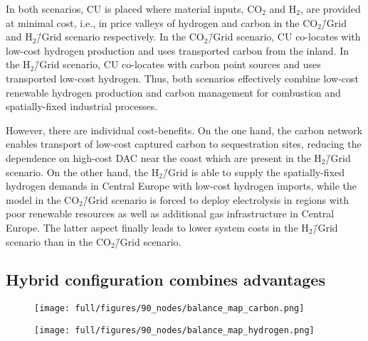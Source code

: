 \documentclass[twocolumn]{article}
\newcommand{\carbon}{CO$_2$}
\newcommand{\hydrogen}{H$_2$}
\newcommand{\carbongrid}{CO$_2$\=/Grid}
\newcommand{\hydrogengrid}{H$_2$\=/Grid}
\newcommand{\carbonscenario}{CO$_2$\=/Grid scenario}
\newcommand{\hydrogenscenario}{H$_2$\=/Grid scenario}
\newcommand{\hybridscenario}{Hybrid scenario}
\begin{document}
In both scenarios, CU is placed where material inputs, \carbon{} and \hydrogen{}, are provided at minimal cost, i.e., in price valleys of hydrogen and carbon in the \carbongrid{} and \hydrogenscenario{} respectively. In the \carbonscenario{}, CU co-locates with low-cost hydrogen production and uses transported carbon from the inland. In the \hydrogenscenario{}, CU co-locates with carbon point sources and uses transported low-cost hydrogen.
Thus, both scenarios effectively combine low-cost renewable hydrogen production and carbon management for combustion and spatially-fixed industrial processes.

However, there are individual cost-benefits. On the one hand, the carbon network enables transport of low-cost captured carbon to sequestration sites, reducing the dependence on high-cost DAC near the coast which are present in the \hydrogenscenario{}. On the other hand, the \hydrogengrid{} is able to supply the spatially-fixed hydrogen demands in Central Europe with low-cost hydrogen imports, while the model in the \carbonscenario{} is forced to deploy electrolysis in regions with poor renewable resources as well as additional gas infrastructure in Central Europe. The latter aspect finally leads to lower system costs in the \hydrogenscenario{} than in the \carbonscenario{}.



\subsection*{Hybrid configuration combines advantages}\label{subsec:Hybrid}


\begin{figure*}[ht!]
    \centering
    \begin{subfigure}{.5\textwidth}
        \centering
        \texttt{[image: full/figures/90\_nodes/balance\_map\_carbon.png]}
        \label{fig:balance_map_carbon_full}
    \end{subfigure}%
    \begin{subfigure}{.5\textwidth}
        \centering
        \texttt{[image: full/figures/90\_nodes/balance\_map\_hydrogen.png]}
        \label{fig:balance_map_hydrogen_full}
    \end{subfigure}
    \caption{Average operation, flows and prices of the carbon (left) and hydrogen (right) sectors in the \hybridscenario{} assuming net \carbon{} neutrality. For each region, upper semicircles show the average production per technology, lower semicircles the consumption, and colors the average marginal prices. Carbon Sequestration offshore is drawn in full circles. Lines and arrows show interregional transportation. Carbon from point-source in the inland either supplies local CU with imported hydrogen or facilitates sequestration in nearby offshore regions.
    }
    \label{fig:balance_map_full}
\end{figure*}
\end{document}
